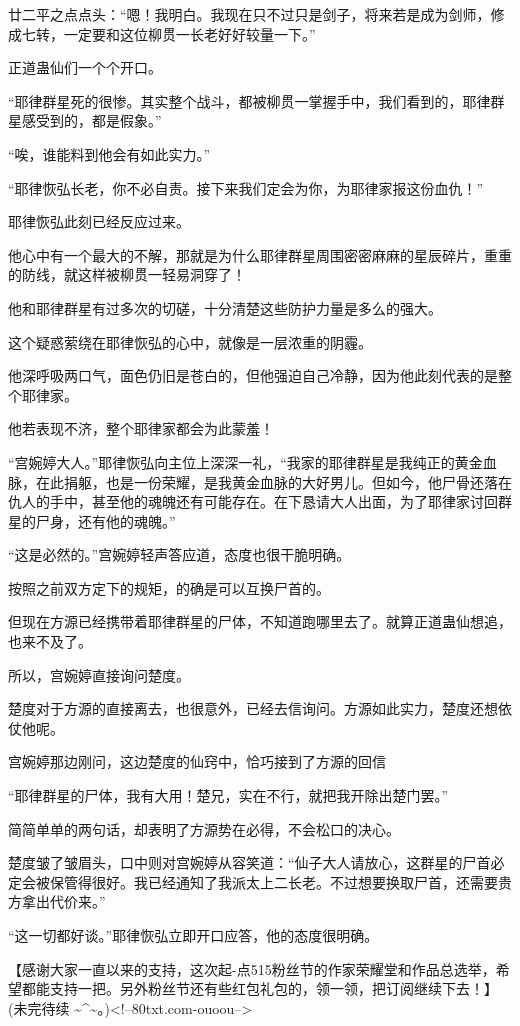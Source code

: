 \begin{this_body}
廿二平之点点头：“嗯！我明白。我现在只不过只是剑子，将来若是成为剑师，修成七转，一定要和这位柳贯一长老好好较量一下。”

正道蛊仙们一个个开口。

“耶律群星死的很惨。其实整个战斗，都被柳贯一掌握手中，我们看到的，耶律群星感受到的，都是假象。”

“唉，谁能料到他会有如此实力。”

“耶律恢弘长老，你不必自责。接下来我们定会为你，为耶律家报这份血仇！”

耶律恢弘此刻已经反应过来。

他心中有一个最大的不解，那就是为什么耶律群星周围密密麻麻的星辰碎片，重重的防线，就这样被柳贯一轻易洞穿了！

他和耶律群星有过多次的切磋，十分清楚这些防护力量是多么的强大。

这个疑惑萦绕在耶律恢弘的心中，就像是一层浓重的阴霾。

他深呼吸两口气，面色仍旧是苍白的，但他强迫自己冷静，因为他此刻代表的是整个耶律家。

他若表现不济，整个耶律家都会为此蒙羞！

“宫婉婷大人。”耶律恢弘向主位上深深一礼，“我家的耶律群星是我纯正的黄金血脉，在此捐躯，也是一份荣耀，是我黄金血脉的大好男儿。但如今，他尸骨还落在仇人的手中，甚至他的魂魄还有可能存在。在下恳请大人出面，为了耶律家讨回群星的尸身，还有他的魂魄。”

“这是必然的。”宫婉婷轻声答应道，态度也很干脆明确。

按照之前双方定下的规矩，的确是可以互换尸首的。

但现在方源已经携带着耶律群星的尸体，不知道跑哪里去了。就算正道蛊仙想追，也来不及了。

所以，宫婉婷直接询问楚度。

楚度对于方源的直接离去，也很意外，已经去信询问。方源如此实力，楚度还想依仗他呢。

宫婉婷那边刚问，这边楚度的仙窍中，恰巧接到了方源的回信

“耶律群星的尸体，我有大用！楚兄，实在不行，就把我开除出楚门罢。”

简简单单的两句话，却表明了方源势在必得，不会松口的决心。

楚度皱了皱眉头，口中则对宫婉婷从容笑道：“仙子大人请放心，这群星的尸首必定会被保管得很好。我已经通知了我派太上二长老。不过想要换取尸首，还需要贵方拿出代价来。”

“这一切都好谈。”耶律恢弘立即开口应答，他的态度很明确。

【感谢大家一直以来的支持，这次起-点515粉丝节的作家荣耀堂和作品总选举，希望都能支持一把。另外粉丝节还有些红包礼包的，领一领，把订阅继续下去！】(未完待续 \~{}\^{}\~{}。)<!--80txt.com-ouoou-->

\end{this_body}

